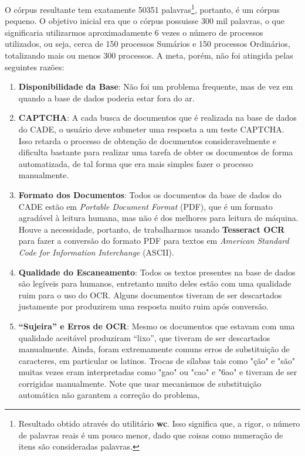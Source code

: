\documentclass[11pt]{report}
\newcommand{\quotes}[1]{``#1''}
\begin{document}
O córpus resultante tem exatamente 50351 palavras\footnote[2]{Resultado obtido através do utilitário \textbf{wc}. Isso significa que, a rigor, o número de palavras
reais é um pouco menor, dado que coisas como numeração de itens são consideradas palavras.}, portanto, é um córpus pequeno. O objetivo inicial era que o córpus
possuisse 300 mil palavras, o que significaria utilizarmos aproximadamente 6 vezes o número de processos utilizados, ou seja, cerca de 150 processos Sumários e
150 processos Ordinários, totalizando mais ou menos 300 processos. A meta, porém, não foi atingida pelas seguintes razões:

\begin{enumerate}[label=\textbf{\arabic*.}]
  \item \textbf{Disponibilidade da Base}: Não foi um problema frequente, mas de vez em quando a base de dados poderia estar fora do ar.
  \item \textbf{CAPTCHA}: A cada busca de documentos que é realizada na base de dados do CADE, o usuário deve submeter uma resposta a um teste CAPTCHA. Isso
  retarda o processo de obtenção de documentos consideravelmente e dificulta bastante para realizar uma tarefa de obter os documentos de forma automatizada, de tal
  forma que era mais simples fazer o processo manualmente.
  \item \textbf{Formato dos Documentos}: Todos os documentos da base de dados do CADE estão em \textit{Portable Document Format} (PDF), que é um formato agradável à
  leitura humana, mas não é dos melhores para leitura de máquina. Houve a necessidade, portanto,  de trabalharmos usando \textbf{Tesseract OCR} para fazer a conversão do
  formato PDF para textos em \textit{American Standard Code for Information Interchange} (ASCII).
  \item \textbf{Qualidade do Escaneamento}: Todos os textos presentes na base de dados são legíveis para humanos, entretanto muito deles estão com uma qualidade ruim para
  o uso do OCR. Alguns documentos tiveram de ser descartados justamente por produzirem uma resposta muito ruim após conversão.
  \item \textbf{\quotes{Sujeira} e Erros de OCR}: Mesmo os documentos que estavam com uma qualidade aceitável produziram \quotes{lixo}, que tiveram de ser descartados
  manualmente. Ainda, foram extremamente comuns erros de substituição de caracteres, em particular os latinos. Trocas de sílabas tais como "ção" e "são" muitas vezes eram
  interpretadas como "gao" ou "cao" e "6ao" e tiveram de ser corrigidas manualmente. Note que usar mecanismos de substituição automática não garantem a correção do problema,

\end{enumerate}
\end{document}
